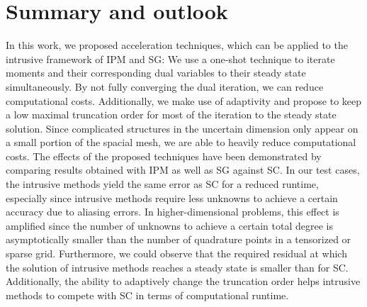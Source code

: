 \section{Summary and outlook}
\label{sec:summary_outlook}
In this work, we proposed acceleration techniques, which can be applied to the intrusive framework of IPM and SG: We use a one-shot technique to iterate moments and their corresponding dual variables to their steady state simultaneously. By not fully converging the dual iteration, we can reduce computational costs. Additionally, we make use of adaptivity and propose to keep a low maximal truncation order for most of the iteration to the steady state solution. Since complicated structures in the uncertain dimension only appear on a small portion of the spacial mesh, we are able to heavily reduce computational costs. The effects of the proposed techniques have been demonstrated by comparing results obtained with IPM as well as SG against SC. In our test cases, the intrusive methods yield the same error as SC for a reduced runtime, especially since intrusive methods require less unknowns to achieve a certain accuracy due to aliasing errors. In higher-dimensional problems, this effect is amplified since the number of unknowns to achieve a certain total degree is asymptotically smaller than the number of quadrature points in a tensorized or sparse grid. Furthermore, we could observe that the required residual at which the solution of intrusive methods reaches a steady state is smaller than for SC. Additionally, the ability to adaptively change the truncation order helps intrusive methods to compete with SC in terms of computational runtime.

